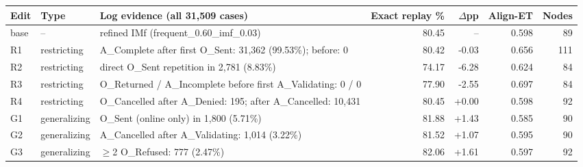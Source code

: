 \begin{tabular}{llp{}rrrr}
\hline
Edit & Type & Log evidence (all 31,509 cases) & Exact replay \% & $\Delta$pp & Align-ET & Nodes \\
\hline
base & -- & refined IMf (frequent\_0.60\_imf\_0.03) & 80.45 & -- & 0.598 & 89 \\
R1 & restricting & A\_Complete after first O\_Sent: 31,362 (99.53\%); before: 0 & 80.42 & -0.03 & 0.656 & 111 \\
R2 & restricting & direct O\_Sent repetition in 2,781 (8.83\%) & 74.17 & -6.28 & 0.624 & 84 \\
R3 & restricting & O\_Returned / A\_Incomplete before first A\_Validating: 0 / 0 & 77.90 & -2.55 & 0.697 & 84 \\
R4 & restricting & O\_Cancelled after A\_Denied: 195; after A\_Cancelled: 10,431 & 80.45 & +0.00 & 0.598 & 92 \\
G1 & generalizing & O\_Sent (online only) in 1,800 (5.71\%) & 81.88 & +1.43 & 0.585 & 90 \\
G2 & generalizing & A\_Cancelled after A\_Validating: 1,014 (3.22\%) & 81.52 & +1.07 & 0.595 & 90 \\
G3 & generalizing & $\geq$2 O\_Refused: 777 (2.47\%) & 82.06 & +1.61 & 0.597 & 92 \\
\hline
\end{tabular}
